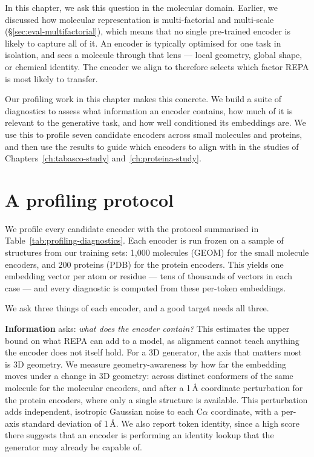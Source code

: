\documentclass[12pt,a4paper,twoside]{report}
\begin{document}
In this chapter, we ask this question in the molecular domain. Earlier, we discussed how molecular representation is multi-factorial and multi-scale (\S\ref{sec:eval-multifactorial}), which means that no single pre-trained encoder is likely to capture all of it. An encoder is typically optimised for one task in isolation, and sees a molecule through that lens --- local geometry, global shape, or chemical identity. The encoder we align to therefore selects which factor REPA is most likely to transfer.

Our profiling work in this chapter makes this concrete. We build a suite of diagnostics to assess what information an encoder contains, how much of it is relevant to the generative task, and how well conditioned its embeddings are. We use this to profile seven candidate encoders across small molecules and proteins, and then use the results to guide which encoders to align with in the studies of Chapters~\ref{ch:tabasco-study} and~\ref{ch:proteina-study}.

\section{A profiling protocol}
\label{sec:profiling-framework}

We profile every candidate encoder with the protocol summarised in Table~\ref{tab:profiling-diagnostics}. Each encoder is run frozen on a sample of structures from our training sets: 1{,}000 molecules (GEOM) for the small molecule encoders, and 200 proteins (PDB) for the protein encoders. This yields one embedding vector per atom or residue --- tens of thousands of vectors in each case --- and every diagnostic is computed from these per-token embeddings.



We ask three things of each encoder, and a good target needs all three.

\textbf{Information} asks: \emph{what does the encoder contain?} This estimates the upper bound on what REPA can add to a model, as alignment cannot teach anything the encoder does not itself hold. For a 3D generator, the axis that matters most is 3D geometry. We measure geometry-awareness by how far the embedding moves under a change in 3D geometry: across distinct conformers of the same molecule for the molecular encoders, and after a 1\,\AA{} coordinate perturbation for the protein encoders, where only a single structure is available. This perturbation adds independent, isotropic Gaussian noise to each C$\alpha$ coordinate, with a per-axis standard deviation of 1\,\AA{}. We also report token identity, since a high score there suggests that an encoder is performing an identity lookup that the generator may already be capable of.
\end{document}

